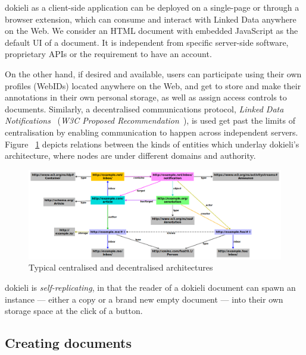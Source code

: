 \documentclass[a4paper]{llncs}
\begin{document}
\par dokieli as a client-side application can be \empty deployed on a single-page or through a browser extension, which can consume and interact with Linked Data anywhere on the Web. We consider an HTML document with embedded JavaScript as the default UI of a document. It is independent from specific server-side software, proprietary APIs or the requirement to have an account.

                                    
\par On the other hand, if desired and available, users can participate using their own profiles (WebIDs) located anywhere on the Web, and get to store and make their annotations in their own personal storage, as well as assign access controls to documents. Similarly, a decentralised communications protocol, \textit{Linked Data Notifications}~\cite{ref-9} (\textit{W3C Proposed Recommendation}~\cite{ref-10}), is used get past the limits of centralisation by enabling communication to happen across independent servers. Figure ~\ref{fig:dokieli-architecture-relations} depicts relations between the kinds of entities which underlay dokieli’s architecture, where nodes are under different domains and authority.

\begin{figure}
  \centering
  \includegraphics[width=\textwidth]{media/images/dokieli-architecture-relations}
  \caption{Typical centralised and decentralised architectures}
  \label{fig:dokieli-architecture-relations}
\end{figure}
                                    
\par dokieli is \textit{self-replicating}, in that the reader of a dokieli document can spawn an instance — either a copy or a brand new empty document — into their own storage space at the click of a button.

                            
                                \subsection{Creating documents}
  \label{creating-documents}
\end{document}
